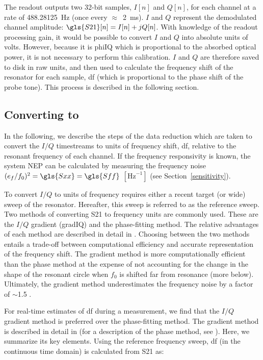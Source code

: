The readout outputs two 32-bit samples, $I[n]$ and $Q[n]$, for each channel at a rate of 488.28125~Hz (once every $\approx$~2~ms). $I$ and $Q$ represent the demodulated channel amplitude: $\gls{S21}[n] = I[n] +jQ[n] $. With knowledge of the readout processing gain, it would be possible to convert $I$ and $Q$ into absolute units of volts. However, because it is \gls{phiIQ} which is proportional to the absorbed optical power, it is not necessary to perform this calibration. $I$ and $Q$ are therefore saved to disk in raw units, and then used to calculate the frequency shift of the resonator for each sample, \gls{df} (which is proportional to the phase shift of the probe tone). This process is described in the following section.

\subsection{Converting  to }\label{df calc}

In the following, we describe the steps of the data reduction which are taken to convert the $I/Q$ timestreams to units of frequency shift, \gls{df}, relative to the resonant frequency of each channel. If the frequency responsivity is known, the system NEP can be calculated by measuring the frequency noise $(e_{f}/f_{0})^{2} = \gls{Sxx} = \gls{Sff}$ $[\mathrm{Hz}^{-1}]$ (see Section~\ref{sensitivity}).

To convert $I/Q$ to units of frequency requires either a recent target (or wide) sweep of the resonator. Hereafter, this sweep is referred to as the reference sweep. Two methods of converting \gls{S21} to frequency units are commonly used. These are the $I/Q$ gradient (\gls{gradIQ}) and the phase-fitting method. The relative advantages of each method are described in detail in \citet{barry2014development}. Choosing between the two methods entails a trade-off between computational efficiency and accurate representation of the frequency shift. The gradient method is more computationally efficient than the phase method at the expense of not accounting for the change in the shape of the resonant circle when $f_{0}$ is shifted far from resonance (more below). Ultimately, the gradient method underestimates the frequency noise by a factor of $\sim$1.5 \citep{barry2014development}.

For real-time estimates of \gls{df} during a measurement, we find that the $I/Q$ gradient method is preferred over the phase-fitting method. The gradient method is described in detail in \citet{d2013nika} (for a description of the phase method, see \citet{gao2008physics}). Here, we summarize its key elements. Using the reference frequency sweep, \gls{df} (in the continuous time domain) is calculated from \gls{S21} as:


